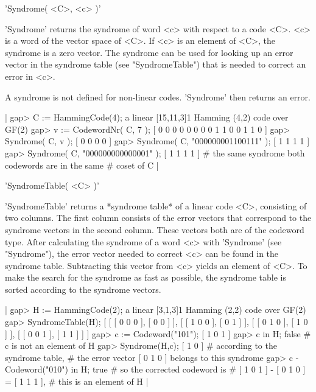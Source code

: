 
'Syndrome( <C>, <c> )'

'Syndrome' returns  the   syndrome of word <c>   with  respect to  a code
<C>. <c>  is a word of  the vector space of <C>.  If <c> is an element of
<C>, the syndrome is a zero vector. The  syndrome can be used for looking
up  an error vector in the  syndrome table (see  "SyndromeTable") that is
needed to correct an error in <c>.

A syndrome is not defined  for non-linear codes. 'Syndrome' then  returns
an error.

|    gap> C := HammingCode(4);
    a linear [15,11,3]1 Hamming (4,2) code over GF(2)
    gap> v := CodewordNr( C, 7 );
    [ 0 0 0 0 0 0 0 0 1 1 0 0 1 1 0 ]
    gap> Syndrome( C, v );
    [ 0 0 0 0 ]
    gap> Syndrome( C, "000000001100111" );
    [ 1 1 1 1 ]
    gap> Syndrome( C, "000000000000001" );
    [ 1 1 1 1 ]    # the same syndrome\: both codewords are in the same
                   # coset of C |


'SyndromeTable( <C> )'

'SyndromeTable'  returns   a  *syndrome table* of   a    linear code <C>,
consisting of two columns. The first column consists of the error vectors
that correspond  to the  syndrome  vectors  in the  second column.  These
vectors both are of the codeword  type. After calculating the syndrome of
a word <c>  with 'Syndrome' (see "Syndrome"), the  error vector needed to
correct  <c> can be found in  the syndrome table. Subtracting this vector
from <c> yields an element of <C>. To make the search for the syndrome as
fast as possible, the syndrome table  is sorted according to the syndrome
vectors.

|    gap> H := HammingCode(2);
    a linear [3,1,3]1 Hamming (2,2) code over GF(2)
    gap> SyndromeTable(H);
    [ [ [ 0 0 0 ], [ 0 0 ] ], [ [ 1 0 0 ], [ 0 1 ] ],
      [ [ 0 1 0 ], [ 1 0 ] ], [ [ 0 0 1 ], [ 1 1 ] ] ]
    gap> c := Codeword("101");
    [ 1 0 1 ]
    gap> c in H;
    false          # c is not an element of H
    gap> Syndrome(H,c);
    [ 1 0 ]        # according to the syndrome table,
                   # the error vector [ 0 1 0 ] belongs to this syndrome
    gap> c - Codeword("010") in H;
    true           # so the corrected codeword is
                   # [ 1 0 1 ] - [ 0 1 0 ] = [ 1 1 1 ],
                   # this is an element of H |


